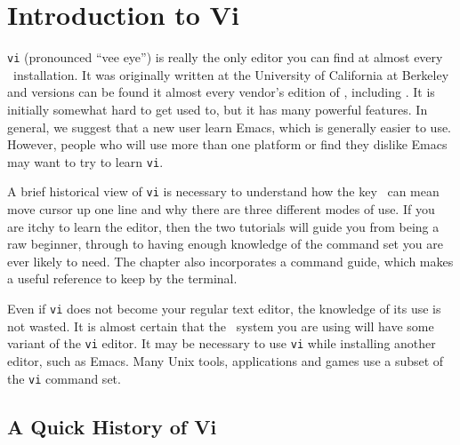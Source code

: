 \chapter{Introduction to Vi}\label{vi-chapter}


{\tt vi} (pronounced ``vee eye'') is really the only editor you can
find at almost every \unix\ installation. It was originally written at
the University of California at 
Berkeley and versions can be
found it almost every vendor's edition of \unix, including \linux. It
is initially somewhat hard to get used to, but it has many powerful
features. In general, we suggest that a new user learn
Emacs, which is generally easier to use. However,
people who will use more than one platform or find they dislike Emacs
may want to try to learn {\tt vi}.


A brief historical view of {\tt vi} is necessary to understand how the
key \ can mean move cursor up one line and why there are three
different modes of use. If you are itchy to learn the editor, then the
two tutorials will guide you from being a raw beginner, through to
having enough knowledge of the command set you are ever likely to
need. The chapter also incorporates a command guide, which makes a
useful reference to keep by the terminal.

Even if {\tt vi} does not become your regular text editor, the
knowledge of its use is not wasted. It is almost certain that the
\unix\ system you are using will have some variant of the {\tt vi}
editor.  It may be necessary to use {\tt vi} while installing another
editor, such as Emacs. Many Unix tools, applications and games use a
subset of the {\tt vi} command set.

\section{A Quick History of Vi}

